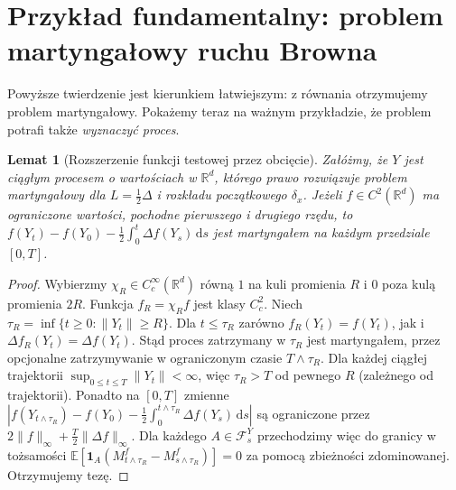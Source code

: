 \documentclass[11pt,a4paper,oneside]{report}
\numberwithin{equation}{chapter}
\theoremstyle{plain}
\newtheorem{lemat}[twierdzenie]{Lemat}
\theoremstyle{definition}
\theoremstyle{remark}
\newcommand{\R}{\mathbb{R}}
\newcommand{\E}{\mathbb{E}}
\newcommand{\calF}{\mathcal{F}}
\newcommand{\ind}[1]{\mathbf{1}_{#1}}
\newcommand{\dd}{\mathrm{d}}
\newcommand{\norm}[1]{\lVert #1\rVert}
\begin{document}
\section{Przykład fundamentalny: problem martyngałowy ruchu Browna}

Powyższe twierdzenie jest kierunkiem łatwiejszym: z równania
otrzymujemy problem martyngałowy. Pokażemy teraz na ważnym
przykładzie, że problem potrafi także \emph{wyznaczyć proces}.

\begin{lemat}[Rozszerzenie funkcji testowej przez obcięcie]
\label{lem:mp-cutoff}
Załóżmy, że $Y$ jest ciągłym procesem o wartościach w $\R^d$,
którego prawo rozwiązuje problem martyngałowy dla
$L=\frac12\Delta$ i rozkładu początkowego $\delta_x$.
Jeżeli $f\in C^2(\R^d)$ ma ograniczone wartości,
pochodne pierwszego i drugiego rzędu, to
$f(Y_t)-f(Y_0)-\frac12\int_0^t\Delta f(Y_s)\,\dd s$
jest martyngałem na każdym przedziale $[0,T]$.
\end{lemat}
\begin{proof}
Wybierzmy $\chi_R\in C_c^\infty(\R^d)$ równą $1$ na
kuli promienia $R$ i $0$ poza kulą promienia $2R$.
Funkcja $f_R=\chi_R f$ jest klasy $C_c^2$.
Niech $\tau_R=\inf\{t\ge0:\norm{Y_t}\ge R\}$.
Dla $t\le\tau_R$ zarówno $f_R(Y_t)=f(Y_t)$,
jak i $\Delta f_R(Y_t)=\Delta f(Y_t)$.
Stąd proces zatrzymany w $\tau_R$ jest martyngałem,
przez opcjonalne zatrzymywanie w ograniczonym czasie
$T\wedge\tau_R$. Dla każdej ciągłej trajektorii
$\sup_{0\le t\le T}\norm{Y_t}<\infty$, więc
$\tau_R>T$ od pewnego $R$ (zależnego od trajektorii).
Ponadto na $[0,T]$ zmienne
$|f(Y_{t\wedge\tau_R})-f(Y_0)
-\frac12\int_0^{t\wedge\tau_R}\Delta f(Y_s)\,\dd s|$
są ograniczone przez
$2\norm f_\infty+\frac T2\norm{\Delta f}_\infty$.
Dla każdego $A\in\calF_s^Y$ przechodzimy więc
do granicy w tożsamości
$\E[\ind A(M_{t\wedge\tau_R}^f-M_{s\wedge\tau_R}^f)]=0$
za pomocą zbieżności zdominowanej. Otrzymujemy tezę.
\end{proof}
\end{document}
